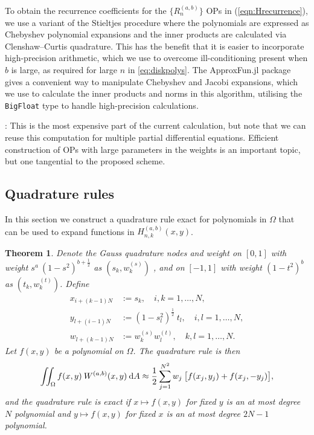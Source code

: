 \documentclass[11pt, oneside]{article}   	%
\newcommand{\half}{\frac{1}{2}}
\newcommand{\hdop}{H}
\newcommand{\hdopnkab}{\hdop_{n,k}^{(a,b)}}
\newcommand{\Wab}{{W^{(a,b)}}}
\newcommand{\genjac}{R}
\newtheorem{theorem}{Theorem}
\begin{document}
To obtain the recurrence coefficients for the $\{\genjac_n^{(a,b)}\}$ OPs in (\ref{eqn:Hrecurrence}), we use a variant of the Stieltjes procedure \cite{gautschi1982generating} where the polynomials are expressed as Chebyshev polynomial expansions and the inner products are calculated via Clenshaw--Curtis quadrature. This has the benefit that it is easier to incorporate high-precision arithmetic, which we use to overcome ill-conditioning present when $b$ is large, as required for large $n$ in \eqref{eq:diskpolys}. The ApproxFun.jl \cite{ApproxFun} package gives a convenient way to manipulate Chebyshev and Jacobi expansions, which we use to calculate the inner products and norms in this algorithm, utilising the {\tt BigFloat} type to handle high-precision calculations.

: 
This is the most expensive part of the current calculation, but note that we can reuse this computation for multiple partial differential equations. Efficient construction of OPs with large parameters in the weights is an important topic, but one tangential to the proposed scheme. 

\subsection{Quadrature rules}

In this section we construct a quadrature rule exact for polynomials in $\Omega$ that can be used to expand functions in $\hdopnkab(x,y)$. 

\begin{theorem}

Denote the  Gauss quadrature nodes and weight on \([0,1]\) with weight \(s^a \: (1-s^2)^{b+\half}\) as $(s_k,w_k^{(s)})$ , and
 on \([-1,1]\) with weight \((1-t^2)^b\) as $(t_k,w_k^{(t)})$. Define
\begin{align*}
x_{i+(k-1)N} &:= s_k, \quad i,k = 1,\dots,N, \\
y_{l+(i-1)N} &:= (1-s_l^2)^\half \: t_l, \quad i,l = 1,\dots,N, \\
w_{l+(k-1)N} &:= w_k^{(s)} w_l^{(t)}, \quad k,l = 1,\dots,N.
\end{align*}
Let $f(x,y)$ be a polynomial on $\Omega$. The quadrature rule is then
$$
\iint_\Omega f(x,y) \: \Wab(x,y) \: \D A \approx \half \sum_{j=1}^{N^2} w_j \: \big[ f(x_j, y_j) + f(x_j, -y_j) \big],
$$
and the quadrature rule is exact if $x \mapsto f(x,y)$ for fixed $y$ is an at most degree $N$ polynomial and $y \mapsto f(x,y)$ for fixed $x$ is an at most degree $2N-1$ polynomial.
\end{theorem}
\end{document}
